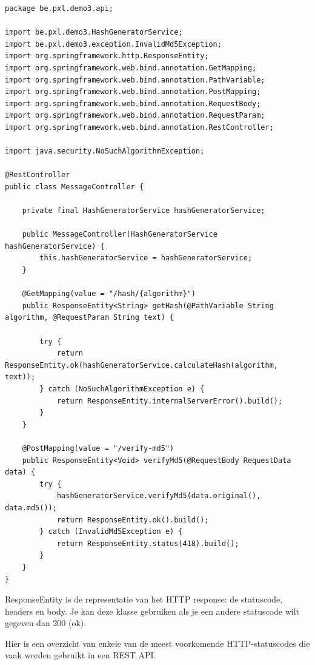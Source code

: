 \begin{lstlisting}
package be.pxl.demo3.api;

import be.pxl.demo3.HashGeneratorService;
import be.pxl.demo3.exception.InvalidMd5Exception;
import org.springframework.http.ResponseEntity;
import org.springframework.web.bind.annotation.GetMapping;
import org.springframework.web.bind.annotation.PathVariable;
import org.springframework.web.bind.annotation.PostMapping;
import org.springframework.web.bind.annotation.RequestBody;
import org.springframework.web.bind.annotation.RequestParam;
import org.springframework.web.bind.annotation.RestController;

import java.security.NoSuchAlgorithmException;

@RestController
public class MessageController {

	private final HashGeneratorService hashGeneratorService;

	public MessageController(HashGeneratorService hashGeneratorService) {
		this.hashGeneratorService = hashGeneratorService;
	}

	@GetMapping(value = "/hash/{algorithm}")
	public ResponseEntity<String> getHash(@PathVariable String algorithm, @RequestParam String text) {

		try {
			return ResponseEntity.ok(hashGeneratorService.calculateHash(algorithm, text));
		} catch (NoSuchAlgorithmException e) {
			return ResponseEntity.internalServerError().build();
		}
	}

	@PostMapping(value = "/verify-md5")
	public ResponseEntity<Void> verifyMd5(@RequestBody RequestData data) {
		try {
			hashGeneratorService.verifyMd5(data.original(), data.md5());
			return ResponseEntity.ok().build();
		} catch (InvalidMd5Exception e) {
			return ResponseEntity.status(418).build();
		}
	}
}

\end{lstlisting}

ResponseEntity is de representatie van het HTTP response: de statuscode, headers en body.  Je kan deze klasse gebruiken als je een andere statuscode wilt gegeven dan 200 (ok).

Hier is een overzicht van enkele van de meest voorkomende HTTP-statuscodes die vaak worden gebruikt in een REST API.

